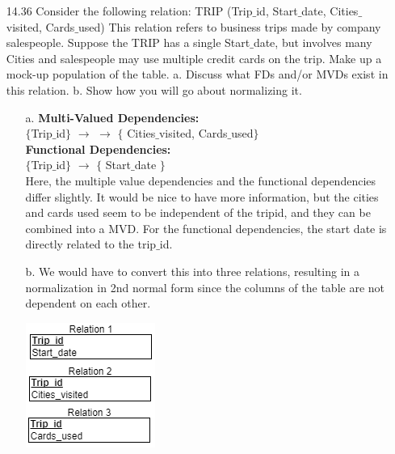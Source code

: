 \documentclass[12pt]{article}
\begin{document}
\begin{enumerate}
	\pagebreak
	\item[14.36]  Consider the following relation: TRIP (Trip$\_$id, Start$\_$date, Cities$\_$visited, Cards$\_$used) This relation refers to business trips made by company salespeople. Suppose the TRIP has a single Start$\_$date, but involves many Cities and salespeople may use multiple credit cards on the trip. Make up a mock-up population of the table. a. Discuss what FDs and/or MVDs exist in this relation. b. Show how you will go about normalizing it.
	\begin{itemize}
		\item[a.]
	\textbf{Multi-Valued Dependencies:} \\	
	$\{$Trip$\_$id$\}$ $\rightarrow$ $\rightarrow$ $\{$ Cities$\_$visited, Cards$\_$used$\}$\\
	
	\textbf{Functional Dependencies:} \\
	$\{$Trip$\_$id$\}$ $\rightarrow$ $\{$ Start$\_$date $\}$\\
	Here, the multiple value dependencies and the functional dependencies differ slightly. It would be nice to have more information, but the cities and cards used seem to be independent of the tripid, and they can be combined into a MVD. For the functional dependencies, the start date is directly related to the trip$\_$id.
	
	\item[b.] We would have to convert this into three relations, resulting in a normalization in 2nd normal form since the columns of the table are not dependent on each other. 
		\begin{center}
			\includegraphics[scale=1]{hw7r6}
		\end{center}
	
	\end{itemize}

	
\end{enumerate}
\end{document}
